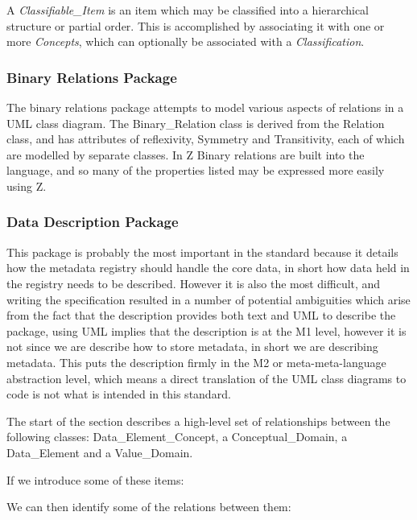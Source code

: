 \documentclass{llncs}
\begin{document}
A \emph{Classifiable\_Item} is an item which may be classified into a hierarchical structure or partial order. This is accomplished by associating it with one or more \emph{Concepts}, which can optionally be associated with a \emph{Classification}. 

\subsubsection{Binary Relations Package}
The binary relations package attempts to model various aspects of relations in a UML class diagram. The Binary\_Relation class is derived from the Relation class, and has attributes of reflexivity, Symmetry and Transitivity, each of which are modelled by separate classes. In Z Binary relations are built into the language, and so many of the properties listed may be expressed more easily using Z.

\subsubsection{Data Description Package}
This package is probably the most important in the standard because it details how the metadata registry should handle the core data, in short how data held in the registry needs to be described. However it is also the most difficult, and writing the specification resulted in a number of potential ambiguities which arise from the fact that the description provides both text and UML to describe the package, using UML implies that the description is at the M1 level, however it is not since we are describe how to store metadata, in short we are describing metadata. This puts the description firmly in the M2 or meta-meta-language abstraction level, which means a direct translation of the UML class diagrams to code is not what is intended in this standard.

The start of the section describes a high-level set of relationships between the following classes: Data\_Element\_Concept, a Conceptual\_Domain, a Data\_Element and a Value\_Domain. 





If we introduce some of these items:
\begin{zed}
\end{zed}
We can then identify some of the relations between them:
\end{document}
